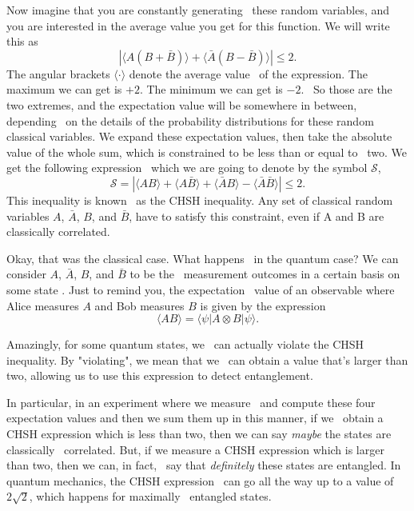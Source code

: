 Now imagine that you are constantly generating 
these random variables, and you are
interested in the average value you get for this function.
We will write this as
\begin{equation}
|\langle A(B+\bar{B})\rangle+\langle\bar{A}(B-\bar{B})\rangle| \leq 2.
\end{equation}
The angular brackets $\langle\cdot\rangle$ denote the average value 
of the expression. The maximum we can
get is $+2$. The minimum we can get is $-2$. 
So those are the two extremes, and the expectation
value will be somewhere in between, depending 
on the details of the probability distributions
for these random classical variables. We expand these expectation values, then take the absolute value of the whole sum,
which is constrained to be less than or equal to 
two.
We get the following expression 
which we are going to denote by the symbol $\mathcal{S}$,
\begin{equation}
\mathcal{S}=|\langle A B\rangle+\langle A \bar{B}\rangle+\langle\bar{A} B\rangle-\langle\bar{A} \bar{B}\rangle| \leq 2.
\label{eq:chsh-inequality}
\end{equation}
This inequality is known 
as the CHSH inequality.
Any set of classical random variables $A$,
$\bar{A}$, $B$, and $\bar{B}$, have to satisfy this constraint, even if A and B are classically correlated.

Okay, that was the classical case. What happens 
in the quantum case? We can consider $A$,
$\bar{A}$, $B$, and $\bar{B}$ to be the 
measurement outcomes in a certain basis on some
state \ket{\psi}. Just to remind you, the expectation 
value of an observable where Alice measures $A$ and
Bob measures $B$ is given by the expression
\begin{equation}
\langle A B\rangle=\langle\psi|A \otimes B| \psi\rangle.
\end{equation}

Amazingly, for some quantum states, we 
can actually violate the CHSH inequality.
By "violating", we mean that we 
can obtain a value that's larger than two, allowing us to use
this expression to detect entanglement.

In particular, in an experiment where we measure 
and compute these four expectation values and then we sum them up in this manner, if we 
obtain a CHSH expression which is less than two,
then we can say \emph{maybe} the states are classically 
correlated. But, if we measure a CHSH expression
which is larger than two, then we can, in fact, 
say that \emph{definitely} these states are entangled.
In quantum mechanics, the CHSH expression 
can go all the way up to a value of $2\sqrt{2}$, which happens for maximally 
entangled states.

